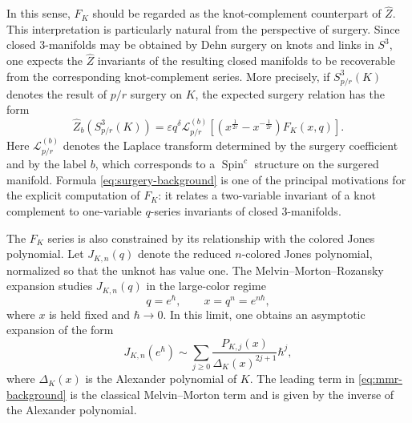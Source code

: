 \documentclass[twocolumn]{article}
\begin{document}
In this sense, $F_K$ should be regarded as the knot-complement counterpart of $\widehat{Z}$.
This interpretation is particularly natural from the perspective of surgery.
Since closed 3-manifolds may be obtained by Dehn surgery on knots and links in $S^3$, one expects the $\widehat{Z}$ invariants of the resulting closed manifolds to be recoverable from the corresponding knot-complement series.
More precisely, if $S^3_{p/r}(K)$ denotes the result of $p/r$ surgery on $K$, the expected surgery relation has
the form
\begin{equation}\label{eq:surgery-background}
  \widehat{Z}_b\left(S^3_{p/r}(K)\right)
  = \varepsilon q^\delta
  \mathcal{L}^{(b)}_{p/r}
  \left[
    \left(x^{\frac{1}{2r}}-x^{-\frac{1}{2r}}\right)F_K(x,q)
  \right].
\end{equation}
Here $\mathcal{L}^{(b)}_{p/r}$ denotes the Laplace transform determined by the surgery coefficient and by the label $b$, which corresponds to a $\operatorname{Spin}^c$ structure on the surgered manifold.  
Formula \eqref{eq:surgery-background} is one of the principal motivations for the explicit computation of $F_K$: it relates a two-variable invariant of a knot complement to one-variable $q$-series invariants of closed 3-manifolds.

The $F_K$ series is also constrained by its relationship with the colored Jones polynomial.  
Let $J_{K,n}(q)$ denote the reduced $n$-colored Jones polynomial, normalized so that the unknot has value one.
The Melvin--Morton--Rozansky expansion studies $J_{K,n}(q)$ in the large-color regime
\begin{equation}
    q=e^\hbar, \qquad x=q^n=e^{n\hbar},
\end{equation}
where $x$ is held fixed and $\hbar\to 0$.  
In this limit, one obtains an asymptotic expansion of the form
\begin{equation}\label{eq:mmr-background}
  J_{K,n}(e^\hbar)
  \sim
  \sum_{j\geq 0}
  \frac{P_{K,j}(x)}{\Delta_K(x)^{2j+1}}\hbar^j,
\end{equation}
where $\Delta_K(x)$ is the Alexander polynomial of $K$.  
The leading term in \eqref{eq:mmr-background} is the classical Melvin--Morton term and is given by the inverse of the Alexander polynomial.
\end{document}

